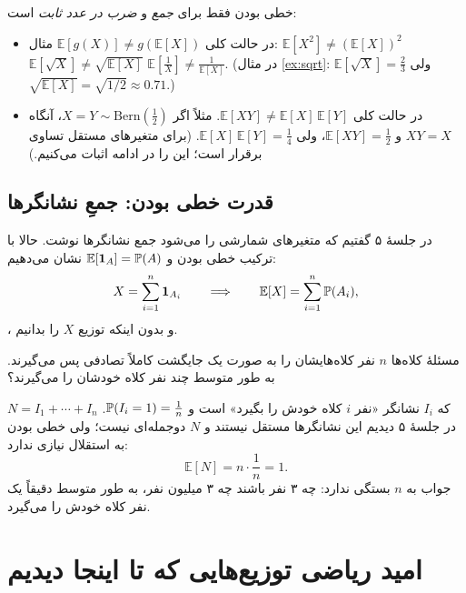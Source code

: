 \begin{warning}
  خطی بودن فقط برای \emph{جمع} و \emph{ضرب در عدد ثابت} است:
  \begin{itemize}
    \item در حالت کلی $\mathbb E[g(X)]\ne g(\mathbb E[X])$ \newline مثال: \quad \quad $\mathbb E[X^2]\ne(\mathbb E[X])^2$ \quad \quad $\mathbb E[\sqrt X]\ne\sqrt{\mathbb E[X]}$ \quad \quad $\mathbb E[\frac1X]\ne\frac{1}{\mathbb E[X]}$.  \newline (در مثال \ref{ex:sqrt}: $\mathbb E[\sqrt X]=\frac23$ ولی $\sqrt{\mathbb E[X]}=\sqrt{1/2}\approx0.71$.)
    \item در حالت کلی $\mathbb E[XY]\ne\mathbb E[X]\,\mathbb E[Y]$. مثلاً اگر $X=Y\sim\mathrm{Bern}(\tfrac12)$، آنگاه $XY=X$ و $\mathbb E[XY]=\tfrac12$، ولی $\mathbb E[X]\,\mathbb E[Y]=\tfrac14$. (برای متغیرهای مستقل تساوی برقرار است؛ این را در ادامه اثبات می‌کنیم.)
  \end{itemize}
\end{warning}

\subsection{قدرت خطی بودن: جمعِ نشانگرها}

در جلسهٔ ۵ گفتیم که متغیرهای شمارشی را می‌شود جمع نشانگرها نوشت. حالا با ترکیب خطی بودن و $\mathbb E[\ind_A]=\P(A)$ نشان می‌دهیم:
\[ X=\sum_{i=1}^n\ind_{A_i}\qquad\Longrightarrow\qquad \mathbb E[X]=\sum_{i=1}^n\P(A_i), \]
، و بدون اینکه توزیع $X$ را بدانیم.

\begin{example}[label=ex:hats-mean]{مسئلهٔ کلاه‌ها}
  $n$ نفر کلاه‌هایشان را به صورت یک جایگشت کاملاً تصادفی پس می‌گیرند. به طور متوسط چند نفر کلاه خودشان را می‌گیرند؟
  \begin{solution}
    $N=I_1+\cdots+I_n$ که $I_i$ نشانگر «نفر $i$ کلاه خودش را بگیرد» است و $\P(I_i=1)=\frac1n$. در جلسهٔ ۵ دیدیم این نشانگرها مستقل نیستند و $N$ دوجمله‌ای نیست؛ ولی خطی بودن به استقلال نیازی ندارد:
    \[ \mathbb E[N]=n\cdot\frac1n=1. \]
    جواب به $n$ بستگی ندارد: چه ۳ نفر باشند چه ۳ میلیون نفر، به طور متوسط دقیقاً یک نفر کلاه خودش را می‌گیرد.
  \end{solution}
\end{example}

\section{امید ریاضی توزیع‌هایی که تا اینجا دیدیم}
\label{sec:expect-dists}

